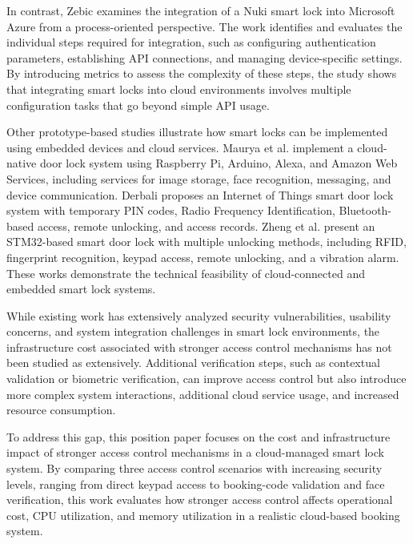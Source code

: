 In contrast, Zebic \cite{zebic2023azure} examines the integration of a Nuki smart lock into Microsoft Azure from a process-oriented perspective. The work identifies and evaluates the individual steps required for integration, such as configuring authentication parameters, establishing API connections, and managing device-specific settings. By introducing metrics to assess the complexity of these steps, the study shows that integrating smart locks into cloud environments involves multiple configuration tasks that go beyond simple API usage.

Other prototype-based studies illustrate how smart locks can be implemented using embedded devices and cloud services. Maurya et al. \cite{maurya2020cloudnative} implement a cloud-native door lock system using Raspberry Pi, Arduino, Alexa, and Amazon Web Services, including services for image storage, face recognition, messaging, and device communication. Derbali \cite{derbali2023iotsdl} proposes an Internet of Things smart door lock system with temporary PIN codes, Radio Frequency Identification, Bluetooth-based access, remote unlocking, and access records. Zheng et al. \cite{zheng2024stm32} present an STM32-based smart door lock with multiple unlocking methods, including RFID, fingerprint recognition, keypad access, remote unlocking, and a vibration alarm. These works demonstrate the technical feasibility of cloud-connected and embedded smart lock systems.

While existing work has extensively analyzed security vulnerabilities, usability concerns, and system integration challenges in smart lock environments, the infrastructure cost associated with stronger access control mechanisms has not been studied as extensively. Additional verification steps, such as contextual validation or biometric verification, can improve access control but also introduce more complex system interactions, additional cloud service usage, and increased resource consumption.

To address this gap, this position paper focuses on the cost and infrastructure impact of stronger access control mechanisms in a cloud-managed smart lock system. By comparing three access control scenarios with increasing security levels, ranging from direct keypad access to booking-code validation and face verification, this work evaluates how stronger access control affects operational cost, CPU utilization, and memory utilization in a realistic cloud-based booking system.